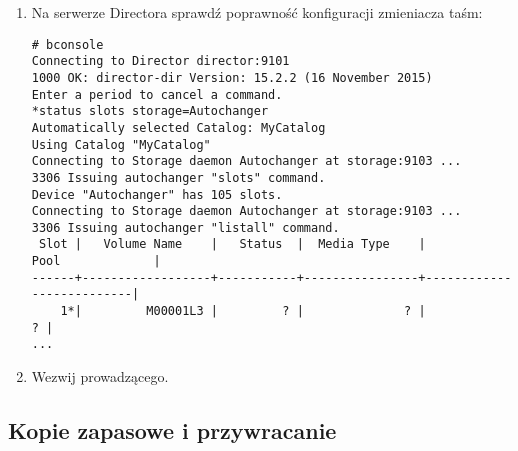 \documentclass[polish]{article}
\begin{document}
\begin{enumerate}
\item Na serwerze Directora sprawdź poprawność konfiguracji zmieniacza taśm:
\begin{verbatim}
# bconsole
Connecting to Director director:9101
1000 OK: director-dir Version: 15.2.2 (16 November 2015)
Enter a period to cancel a command.
*status slots storage=Autochanger
Automatically selected Catalog: MyCatalog
Using Catalog "MyCatalog"
Connecting to Storage daemon Autochanger at storage:9103 ...
3306 Issuing autochanger "slots" command.
Device "Autochanger" has 105 slots.
Connecting to Storage daemon Autochanger at storage:9103 ...
3306 Issuing autochanger "listall" command.
 Slot |   Volume Name    |   Status  |  Media Type    |         Pool             |
------+------------------+-----------+----------------+--------------------------|
    1*|         M00001L3 |         ? |              ? |                        ? |
...
\end{verbatim}

\item Wezwij prowadzącego.

\end{enumerate}


\subsection*{Kopie zapasowe i przywracanie}
\end{document}
